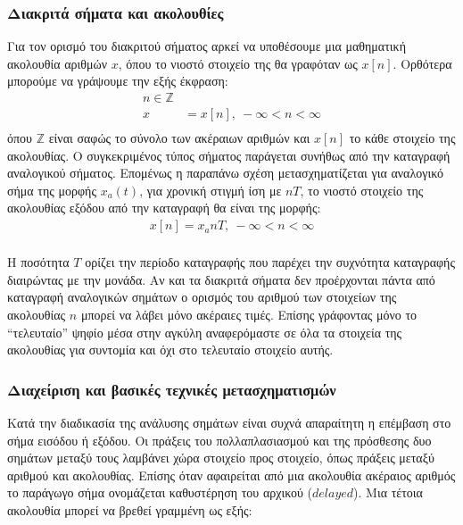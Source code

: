 \documentclass[breaklines=true, 12pt]{article}
\begin{document}
\subsubsection{Διακριτά σήματα και ακολουθίες}
\label{sec:orgcbd63a1}
Για τον ορισμό του διακριτού σήματος αρκεί να υποθέσουμε μια μαθηματική
ακολουθία αριθμών \(x\), όπου το νιοστό στοιχείο της θα γραφόταν ως \(x[n]\).
Ορθότερα μπορούμε να γράψουμε την εξής έκφραση:
\begin{equation}
\begin{align}
n \in \mathbb{Z} \\
x &= {x[n]},\  -\infty < n < \infty \\
\end{align}
\end{equation}
όπου \(\mathbb{Z}\) είναι σαφώς το σύνολο των ακέραιων αριθμών και \(x[n]\) το κάθε στοιχείο
της ακολουθίας. Ο συγκεκριμένος τύπος σήματος παράγεται συνήθως από την
καταγραφή αναλογικού σήματος. Επομένως η παραπάνω σχέση μετασχηματίζεται
για αναλογικό σήμα της μορφής \(x_{a}(t)\), για χρονική στιγμή ίση με \(nT\), το
νιοστό στοιχείο της ακολουθίας εξόδου από την καταγραφή θα είναι της
μορφής:
\begin{equation}
\begin{align}
x[n] = x_{a} nT,\ -\infty < n < \infty \\
\end{align}
\end{equation}

Η ποσότητα \(T\) ορίζει την περίοδο καταγραφής που παρέχει την συχνότητα
καταγραφής διαιρώντας με την μονάδα. Αν και τα διακριτά σήματα δεν
προέρχονται πάντα από καταγραφή αναλογικών σημάτων ο ορισμός του αριθμού
των στοιχείων της ακολουθίας \(n\) μπορεί να λάβει μόνο ακέραιες τιμές. Επίσης
γράφοντας μόνο το “τελευταίο” ψηφίο μέσα στην αγκύλη αναφερόμαστε σε όλα
τα στοιχεία της ακολουθίας για συντομία και όχι στο τελευταίο στοιχείο
αυτής.
\subsubsection{Διαχείριση και βασικές τεχνικές μετασχηματισμών}
\label{sec:org3d058f5}
Κατά την διαδικασία της ανάλυσης σημάτων είναι συχνά απαραίτητη η επέμβαση
στο σήμα εισόδου ή εξόδου. Οι πράξεις του πολλαπλασιασμού και της πρόσθεσης
δυο σημάτων μεταξύ τους λαμβάνει χώρα στοιχείο προς στοιχείο, όπως πράξεις
μεταξύ αριθμού και ακολουθίας. Επίσης όταν αφαιρείται από μια ακολουθία
ακέραιος αριθμός το παράγωγο σήμα ονομάζεται καθυστέρηση του αρχικού
(\(delayed\)). Μια τέτοια ακολουθία μπορεί να βρεθεί γραμμένη ως εξής:
\end{document}
